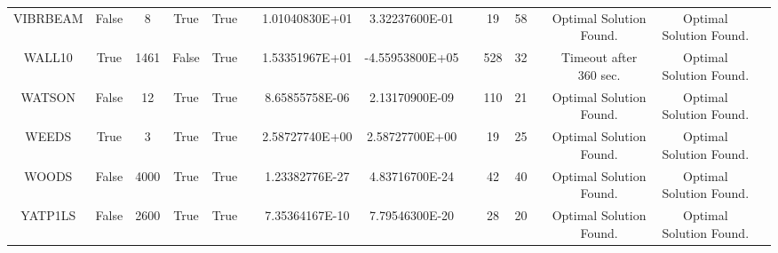 \begin{longtable}{ccccccccccccccc}
	\cellcolor{default2} VIBRBEAM& \cellcolor{default2} False& \cellcolor{default2} 8& \cellcolor{default2} True& \cellcolor{default2} True& \cellcolor{header} & \cellcolor{poor} 1.01040830E+01& \cellcolor{best} 3.32237600E-01& \cellcolor{header} & \cellcolor{best} 19& \cellcolor{poor} 58& \cellcolor{header} & \cellcolor{default2} Optimal Solution Found.& \cellcolor{default2} Optimal Solution Found.& \cellcolor{header} \\
	\cellcolor{default1} WALL10& \cellcolor{default1} True& \cellcolor{default1} 1461& \cellcolor{default1} False& \cellcolor{default1} True& \cellcolor{header} & \cellcolor{poor} 1.53351967E+01& \cellcolor{best} -4.55953800E+05& \cellcolor{header} & \cellcolor{poor} 528& \cellcolor{best} 32& \cellcolor{header} & \cellcolor{default1} Timeout after 360 sec.& \cellcolor{default1} Optimal Solution Found.& \cellcolor{header} \\
	\cellcolor{default2} WATSON& \cellcolor{default2} False& \cellcolor{default2} 12& \cellcolor{default2} True& \cellcolor{default2} True& \cellcolor{header} & \cellcolor{ok} 8.65855758E-06& \cellcolor{best} 2.13170900E-09& \cellcolor{header} & \cellcolor{poor} 110& \cellcolor{best} 21& \cellcolor{header} & \cellcolor{default2} Optimal Solution Found.& \cellcolor{default2} Optimal Solution Found.& \cellcolor{header} \\
	\cellcolor{default1} WEEDS& \cellcolor{default1} True& \cellcolor{default1} 3& \cellcolor{default1} True& \cellcolor{default1} True& \cellcolor{header} & \cellcolor{ok} 2.58727740E+00& \cellcolor{best} 2.58727700E+00& \cellcolor{header} & \cellcolor{best} 19& \cellcolor{ok} 25& \cellcolor{header} & \cellcolor{default1} Optimal Solution Found.& \cellcolor{default1} Optimal Solution Found.& \cellcolor{header} \\
	\cellcolor{default2} WOODS& \cellcolor{default2} False& \cellcolor{default2} 4000& \cellcolor{default2} True& \cellcolor{default2} True& \cellcolor{header} & \cellcolor{best} 1.23382776E-27& \cellcolor{ok} 4.83716700E-24& \cellcolor{header} & \cellcolor{ok} 42& \cellcolor{best} 40& \cellcolor{header} & \cellcolor{default2} Optimal Solution Found.& \cellcolor{default2} Optimal Solution Found.& \cellcolor{header} \\
	\cellcolor{default1} YATP1LS& \cellcolor{default1} False& \cellcolor{default1} 2600& \cellcolor{default1} True& \cellcolor{default1} True& \cellcolor{header} & \cellcolor{ok} 7.35364167E-10& \cellcolor{best} 7.79546300E-20& \cellcolor{header} & \cellcolor{ok} 28& \cellcolor{best} 20& \cellcolor{header} & \cellcolor{default1} Optimal Solution Found.& \cellcolor{default1} Optimal Solution Found.& \cellcolor{header} \\

\end{longtable}
